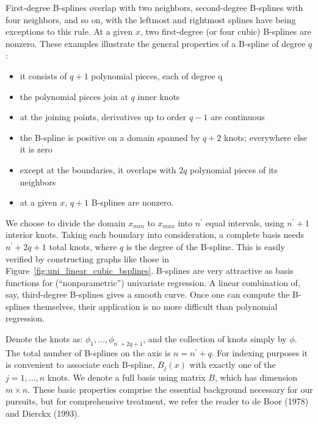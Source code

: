 \documentclass[12pt]{article}
\begin{document}
First-degree B-splines overlap with two neighbors, second-degree B-splines with four neighbors, and so on, with the leftmost and rightmost splines have being exceptions to this rule. At a given $x$, two first-degree (or four cubic) B-splines are nonzero. These examples illustrate the general properties of a B-spline of degree $q$:

\begin{itemize}
\item it consists of $q + 1$ polynomial pieces, each of degree q\\
\item the polynomial pieces join at $q$ inner knots\\
\item at the joining points, derivatives up to order $q - 1$ are continuous\\
\item the B-spline is positive on a domain spanned by $q +2$ knots; everywhere else it is zero\\
\item except at the boundaries, it overlaps with $2q$ polynomial pieces of its neighbors\\
\item at a given $x$, $q +1$ B-splines are nonzero.
\end{itemize}

We choose to divide the domain $x_{min}$ to $x_{max}$ into $n^\prime$ equal intervals, using $n^\prime +1$ interior knots. Taking each boundary into consideration, a complete basis needs $n^\prime + 2q + 1$ total knots, where $q$ is the degree of the B-spline. This is easily verified by constructing graphs like those in Figure~\ref{fig:uni_linear_cubic_bsplines}. B-splines are very attractive as basis functions for (``nonparametric'') univariate regression. A linear combination of, say, third-degree B-splines gives a smooth curve. Once one can compute the B-splines themselves, their application is no more difficult than polynomial regression.

Denote the knots as: $\phi_1,\dots ,\phi_{n^\prime+2q+1}$, and the collection of knots simply by $\phi$. The total number of B-splines on the axis is $n = n^\prime + q$. For indexing purposes it is convenient to associate each B-spline, $B_j\left(x\right)$ with exactly one of the $j = 1, \dots , n$ knots. We denote a full basis using matrix $B$, which has dimension $m \times n$. These basic properties comprise the essential background necessary for our pursuits, but for comprehensive treatment, we refer the reader to de Boor (1978) and Dierckx (1993).
\end{document}

